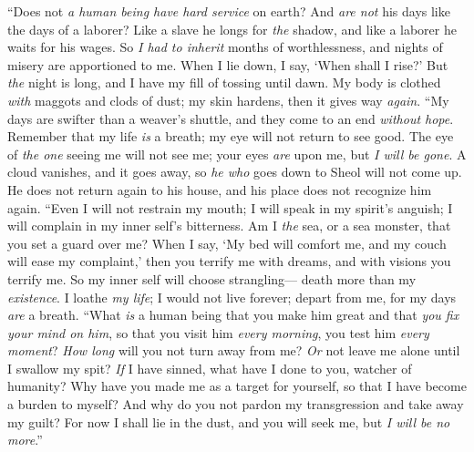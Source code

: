 \begin{biblechapter} %
 “Does not \textit{a human being have hard service} on earth? 
And \textit{are not} his days like the days of a laborer?
\verse Like a slave he longs for \textit{the} shadow, 
and like a laborer he waits for his wages.
\verse So \textit{I had to inherit} months of worthlessness, 
and nights of misery are apportioned to me.
\verse When I lie down, I say, ‘When shall I rise?’ 
But \textit{the} night is long, 
and I have my fill of tossing until dawn.
\verse My body is clothed \textit{with} maggots and clods of dust; 
my skin hardens, then it gives way \textit{again}.
\verse “My days are swifter than a weaver’s shuttle, 
and they come to an end \textit{without hope}.
\verse Remember that my life \textit{is} a breath; 
my eye will not return to see good.
\verse The eye of \textit{the one} seeing me will not see me; 
your eyes \textit{are} upon me, but \textit{I will be gone}.
\verse A cloud vanishes, and it goes away, 
so \textit{he who} goes down to Sheol will not come up.
\verse He does not return again to his house, 
and his place does not recognize him again.
\verse “Even I will not restrain my mouth; 
I will speak in my spirit’s anguish; 
I will complain in my inner self’s bitterness.
\verse Am I \textit{the} sea, or a sea monster, 
that you set a guard over me?
\verse When I say, ‘My bed will comfort me, 
and my couch will ease my complaint,’
\verse then you terrify me with dreams, 
and with visions you terrify me.
\verse So my inner self will choose strangling— 
death more than my \textit{existence}.
\verse I loathe \textit{my life}; I would not live forever; 
depart from me, for my days \textit{are} a breath.
\verse “What \textit{is} a human being that you make him great 
and that \textit{you fix your mind on him},
\verse so that you visit him \textit{every morning}, 
you test him \textit{every moment}?
\verse \textit{How long} will you not turn away from me? 
\textit{Or} not leave me alone until I swallow my spit?
\verse \textit{If} I have sinned, what have I done to you, watcher of humanity? 
Why have you made me as a target for yourself, 
so that I have become a burden to myself?
\verse And why do you not pardon my transgression 
and take away my guilt? 
For now I shall lie in the dust, 
and you will seek me, but \textit{I will be no more}.”
\end{biblechapter}

